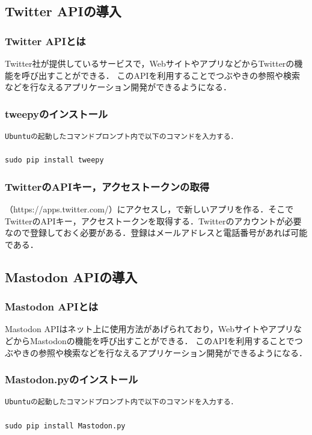 \subsection{Twitter APIの導入}

\subsubsection{Twitter APIとは}
Twitter社が提供しているサービスで，WebサイトやアプリなどからTwitterの機能を呼び出すことができる．
このAPIを利用することでつぶやきの参照や検索などを行なえるアプリケーション開発ができるようになる．
\subsubsection{tweepyのインストール}
\begin{verbatim}
Ubuntuの起動したコマンドプロンプト内で以下のコマンドを入力する．

sudo pip install tweepy
\end{verbatim}
\subsubsection{TwitterのAPIキー，アクセストークンの取得}
（https://apps.twitter.com/）にアクセスし，で新しいアプリを作る．そこでTwitterのAPIキー，アクセストークンを取得する．Twitterのアカウントが必要なので登録しておく必要がある．登録はメールアドレスと電話番号があれば可能である．

\newpage
\subsection{Mastodon APIの導入}
\subsubsection{Mastodon APIとは}
Mastodon APIはネット上に使用方法があげられており，WebサイトやアプリなどからMastodonの機能を呼び出すことができる．
このAPIを利用することでつぶやきの参照や検索などを行なえるアプリケーション開発ができるようになる．
\subsubsection{Mastodon.pyのインストール}
\begin{verbatim}
Ubuntuの起動したコマンドプロンプト内で以下のコマンドを入力する．

sudo pip install Mastodon.py

\end{verbatim}
